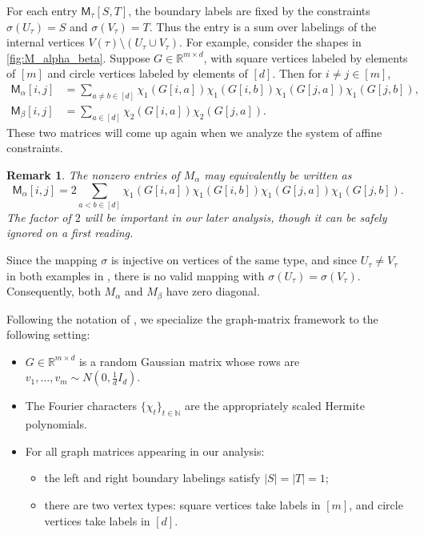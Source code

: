 \documentclass[12pt]{article}
\newtheorem{remark}[theorem]{Remark}
\newcommand{\cm}{\mathsf{M} }
\begin{document}
For each entry \(\cm_\tau[S,T]\), the boundary labels are fixed by the constraints
\(\sigma(U_\tau)=S\) and \(\sigma(V_\tau)=T\). Thus the entry is a sum over labelings
of the internal vertices
\(
    V(\tau)\setminus (U_\tau\cup V_\tau).
\)
For example, consider the shapes in \cref{fig:M_alpha_beta}. Suppose
\(G\in \mathbb R^{m\times d}\), with square vertices labeled by elements of \([m]\)
and circle vertices labeled by elements of \([d]\). Then for \(i\neq j\in[m]\),
\begin{align*}
    \cm_{\alpha}[i,j]
    &=
    \sum_{a\neq b\in[d]}
    \chi_1(G[i,a])\chi_1(G[i,b])
    \chi_1(G[j,a])\chi_1(G[j,b]), \\
    \cm_{\beta}[i,j]
    &=
    \sum_{a\in[d]}
    \chi_2(G[i,a])\chi_2(G[j,a]).
\end{align*}
These two matrices will come up again when we analyze the system of affine constraints.
\begin{remark}
The nonzero entries of \(M_\alpha\) may equivalently be written as
\[
    \cm_{\alpha}[i,j]
    =
    2\sum_{a<b\in[d]}
    \chi_1(G[i,a])\chi_1(G[i,b])
    \chi_1(G[j,a])\chi_1(G[j,b]).
\]
The factor of \(2\) will be important in our later analysis, though it can be
safely ignored on a first reading.
\end{remark}

Since the mapping \(\sigma\) is injective on vertices of the same type, and since
\(U_\tau\neq V_\tau\) in both examples in , there is no valid
mapping with \(\sigma(U_\tau)=\sigma(V_\tau)\). Consequently, both \(M_\alpha\) and
\(M_\beta\) have zero diagonal.

Following the notation of \cite{HKPX23}, we specialize the graph-matrix framework to
the following setting:
\begin{itemize}
    \item \(G\in\mathbb R^{m\times d}\) is a random Gaussian matrix whose rows are
    \(v_1,\ldots,v_m\sim N(0,\frac1d I_d)\).
    \item The Fourier characters \(\{\chi_t\}_{t\in\mathbb N}\) are the appropriately
    scaled Hermite polynomials.
    \item For all graph matrices appearing in our analysis:
    \begin{itemize}
        \item the left and right boundary labelings satisfy \(|S|=|T|=1\);
        \item there are two vertex types: square vertices take labels in \([m]\), and
        circle vertices take labels in \([d]\).
    \end{itemize}
\end{itemize}
\end{document}
